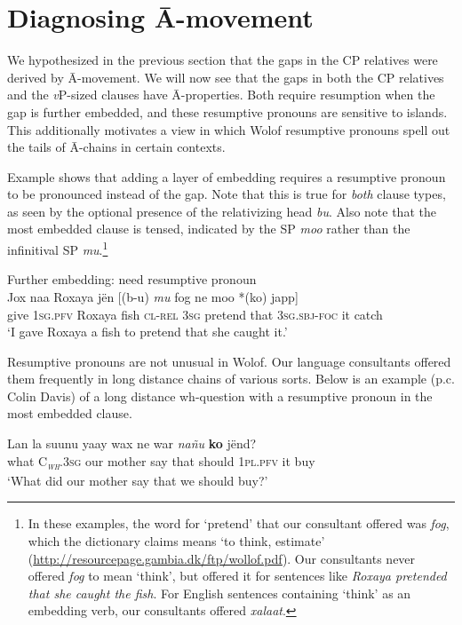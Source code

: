 \documentclass[output=paper]{langscibook}
\begin{document}
\section{Diagnosing \={A}-movement} \label{sec:newman:abar}

We hypothesized in the previous section that the gaps in the CP relatives were derived by \={A}-movement. We will now see that the gaps in both the CP relatives and the \textit{v}P-sized clauses have \={A}-properties. Both require resumption when the gap is further embedded, and these resumptive pronouns are sensitive to islands. This additionally motivates a view in which Wolof resumptive pronouns spell out the tails of \={A}-chains in certain contexts. 

Example  shows that adding a layer of embedding requires a resumptive pronoun to be pronounced instead of the gap. Note that this is true for \emph{both} clause types, as seen by the optional presence of the relativizing head \emph{bu}. Also note that the most embedded clause is tensed, indicated by the SP \emph{moo} rather than the infinitival SP \emph{mu}.\footnote{In these examples, the word for `pretend' that our consultant offered was \emph{fog}, which the dictionary claims means `to think, estimate' (\url{http://resourcepage.gambia.dk/ftp/wollof.pdf}). Our consultants never offered \emph{fog} to mean `think', but offered it for sentences like \emph{Roxaya pretended that she caught the fish}. For English sentences containing `think' as an embedding verb, our consultants offered \emph{xalaat}.}

\begin{exe}
	\ex\label{ex:newman:femb} Further embedding: need resumptive pronoun\\
	\gll Jox naa Roxaya j\"en [(b-u) \emph{mu} fog ne moo *(ko) japp] \\
	give \textsc{1sg.pfv} Roxaya fish \textsc{cl-rel} 3\textsc{sg} pretend that 3\textsc{sg.sbj-foc} it catch \\
	\trans `I gave Roxaya a fish to pretend that she caught it.'
\end{exe}

Resumptive pronouns are not unusual in Wolof. Our language consultants offered them frequently in long distance chains of various sorts. Below is an example (p.c. Colin Davis) of a long distance wh-question with a resumptive pronoun in the most embedded clause. 

\begin{exe}
	\ex \label{ex:newman:longwh}
	\gll Lan la suunu yaay wax ne war \emph{na\~nu} \textbf{ko} j\"{e}nd? \\
	what \textsc{C\textsubscript{\normalfont\textit{wh}}.3sg} our mother say that should \textsc{1pl.pfv} it buy \\
	\trans `What did our mother say that we should buy?' 
\end{exe}
\end{document}
